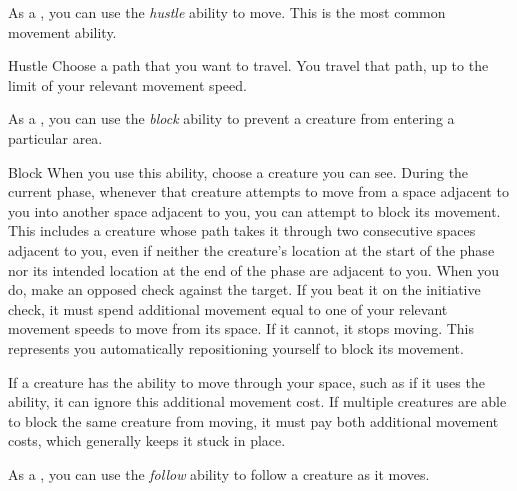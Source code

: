        \label{Hustle} As a , you can use the \textit{hustle} ability to move.
        This is the most common movement ability.

        \begin{activeability}{Hustle}
            \rankline
            Choose a path that you want to travel.
            You travel that path, up to the limit of your relevant movement speed.
        \end{activeability}

        \label{Block} As a , you can use the \textit{block} ability to prevent a creature from entering a particular area.

        \begin{activeability}{Block}
            \rankline
            When you use this ability, choose a creature you can see.
            During the current phase, whenever that creature attempts to move from a space adjacent to you into another space adjacent to you, you can attempt to block its movement.
            This includes a creature whose path takes it through two consecutive spaces adjacent to you, even if neither the creature's location at the start of the phase nor its intended location at the end of the phase are adjacent to you.
            When you do, make an opposed  check against the target.
            If you beat it on the initiative check, it must spend additional movement equal to one of your relevant movement speeds to move from its space.
            If it cannot, it stops moving.
            This represents you automatically repositioning yourself to block its movement.

            If a creature has the ability to move through your space, such as if it uses the  ability, it can ignore this additional movement cost.
            If multiple creatures are able to block the same creature from moving, it must pay both additional movement costs, which generally keeps it stuck in place.
        \end{activeability}

        \label{Follow} As a , you can use the \textit{follow} ability to follow a creature as it moves.


